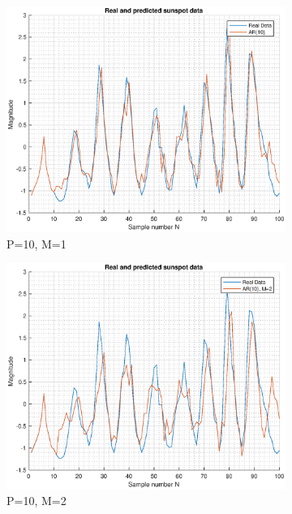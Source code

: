 \documentclass{article}
\begin{document}
\begin{figure}[h!]
\begin{subfigure}{0.24\textwidth}
\includegraphics[width = \textwidth]{ar_mod10_hor1}
\caption{P=10, M=1}
\label{fig:ar_mod10_hor1}
\end{subfigure}
\begin{subfigure}{0.24\textwidth}
\centering
\includegraphics[width = \textwidth]{ar_mod10_hor2}
\caption{P=10, M=2}
\label{fig:ar_mod10_hor2}
\end{subfigure}
\begin{subfigure}{0.24\textwidth}
\centering

\end{subfigure}
\end{figure}
\end{document}
